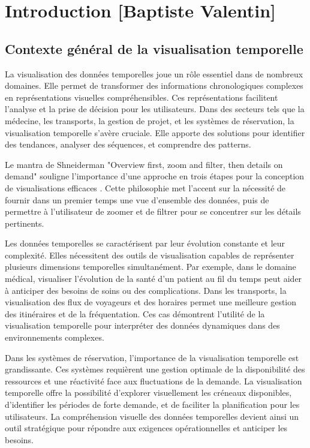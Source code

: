 \documentclass[runningheads]{llncs}
\begin{document}
\section{Introduction [Baptiste Valentin]}

\subsection{Contexte général de la visualisation temporelle}
La visualisation des données temporelles joue un rôle essentiel dans de nombreux domaines. Elle permet de transformer des informations chronologiques complexes en représentations visuelles compréhensibles. Ces représentations facilitent l'analyse et la prise de décision pour les utilisateurs. Dans des secteurs tels que la médecine, les transports, la gestion de projet, et les systèmes de réservation, la visualisation temporelle s'avère cruciale. Elle apporte des solutions pour identifier des tendances, analyser des séquences, et comprendre des patterns.

Le mantra de Shneiderman "Overview first, zoom and filter, then details on demand" souligne l'importance d'une approche en trois étapes pour la conception de visualisations efficaces \cite{shneiderman_eyes_2003}. Cette philosophie met l'accent sur la nécessité de fournir dans un premier temps une vue d'ensemble des données, puis de permettre à l'utilisateur de zoomer et de filtrer pour se concentrer sur les détails pertinents.

Les données temporelles se caractérisent par leur évolution constante et leur complexité. Elles nécessitent des outils de visualisation capables de représenter plusieurs dimensions temporelles simultanément. Par exemple, dans le domaine médical, visualiser l’évolution de la santé d’un patient au fil du temps peut aider à anticiper des besoins de soins ou des complications. Dans les transports, la visualisation des flux de voyageurs et des horaires permet une meilleure gestion des itinéraires et de la fréquentation. Ces cas démontrent l’utilité de la visualisation temporelle pour interpréter des données dynamiques dans des environnements complexes.

Dans les systèmes de réservation, l’importance de la visualisation temporelle est grandissante. Ces systèmes requièrent une gestion optimale de la disponibilité des ressources et une réactivité face aux fluctuations de la demande. La visualisation temporelle offre la possibilité d’explorer visuellement les créneaux disponibles, d’identifier les périodes de forte demande, et de faciliter la planification pour les utilisateurs. La compréhension visuelle des données temporelles devient ainsi un outil stratégique pour répondre aux exigences opérationnelles et anticiper les besoins.
\end{document}
